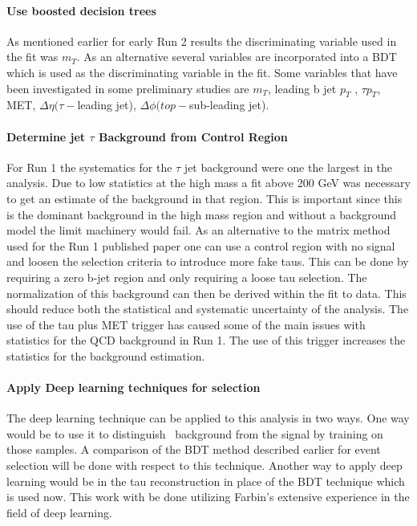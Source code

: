 \paragraph{Use boosted decision trees}
As mentioned earlier for early Run 2 results the discriminating variable used in the fit was $m_T$. As an alternative several 
variables are incorporated into a BDT which is used as the discriminating variable in the fit.  Some variables that have been investigated in some preliminary studies
are $m_T$, leading b jet $p_T$ , $\tau p_T$, MET, $\Delta \eta(\tau-$leading jet), $\Delta \phi(top-$sub-leading jet).

\paragraph{Determine jet \too $\tau$ Background from Control Region}  %
For Run 1 the systematics for the $\tau$ \too jet background were one the largest in the analysis.  Due to low statistics at the high mass a fit above 200 GeV was necessary to get 
an estimate of the background in that region.  This is important since this is the dominant background in the high mass region and without a background model the limit machinery would fail.
As an alternative to the matrix method used for the Run 1 published paper one can use a control region with no signal and loosen the selection criteria to introduce more fake taus.  This can be done
by requiring a zero b-jet region and only requiring a loose tau selection.  The normalization of this background can then be derived within the fit to data.  This should reduce both the statistical and systematic uncertainty of the analysis.
The use of the tau plus MET trigger has caused some of the main issues with statistics for the QCD background in Run 1. 
The use of this trigger increases the statistics for the background estimation.

\paragraph{Apply Deep learning techniques for selection}
The deep learning technique can be applied to this analysis in two ways.  One way would be to use it to distinguish \ttbar\ background from the signal by training on those samples.
A comparison of the BDT method described earlier for event selection will be done with respect to this technique.
Another way to apply deep learning would be in the tau reconstruction in place of the BDT technique which is used now.  This work with be done utilizing Farbin's extensive experience in the field of deep learning.


